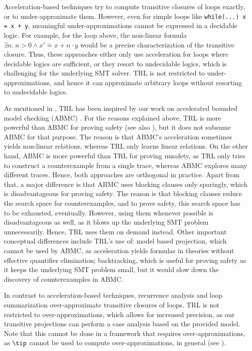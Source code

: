 Acceleration-based techniques \cite{kroening15,abmc,adcl,bozga10,FlatFramework} try to compute transitive closures of loops exactly, or to under-ap\-prox\-i\-mate them.
%
However, even for simple loops like {\tt while(...) x = x + y}, meaningful under-ap\-prox\-i\-ma\-tions cannot be expressed in a decidable logic.
%
For example, for the loop above, the non-linear formula $\exists n.\ n > 0 \land x' \doteq x + n \cdot y$ would be a precise characterization of the transitive closure.
%
Thus, these approaches either only use acceleration for loops where decidable logics are sufficient, or they resort to undecidable logics, which is challenging for the underlying SMT solver.
%
TRL is not restricted to under-ap\-prox\-i\-ma\-tions, and hence it can ap\-prox\-i\-mate arbitrary loops without resorting to undecidable logics.

As mentioned in , TRL has been inspired by our work on accelerated bounded
model checking (ABMC) \cite{abmc}.
%
For the reasons explained above, TRL is more powerful than ABMC for proving safety (see also ), but it does not subsume ABMC for that purpose.
%
The reason is that ABMC's acceleration sometimes yields non-linear relations, whereas TRL only learns linear relations.
%
On the other hand, ABMC is more powerful than TRL for proving unsafety, as TRL only tries to construct a counterexample from a single trace, whereas ABMC explores many different traces.
%
Hence, both approaches are orthogonal in practice.
%
Apart from that, a major difference is that ABMC uses blocking clauses only sparingly, which is disadvantageous for proving safety.
%
The reason is that blocking clauses reduce the search space for counterexamples, and to prove safety, this search space has to be exhausted, eventually.
%
However, using them whenever possible is disadvantageous as well, as it blows up the underlying SMT problem unnecessarily.
%
Hence, TRL uses them on demand instead.
%
Other important conceptual differences include TRL's use of: model based projection, which
cannot be used by ABMC, as acceleration yields formulas in theories without effective
quantifier elimination; backtracking, which is useful for proving safety as it keeps the
underlying SMT problem small, but it would slow down the discovery of counterexamples in
ABMC.
  

In contrast to acceleration-based techniques, recurrence analysis and loop summarization \cite{kincaid15,silverman19,kincaid24,kroening13} over-ap\-prox\-i\-mate transitive closures of loops.
%
TRL is not restricted to over-ap\-prox\-i\-ma\-tions, which allows for increased precision, as our transitive projections can perform a case analysis based on the provided model.
%
Note that this cannot be done in a framework that requires over-ap\-prox\-i\-ma\-tions, as $\tip$ cannot be used to compute over-approximations, in general (see ).


